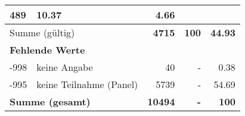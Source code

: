 \begin{longtable}{lXrrr}
       \num{489} &
       \num[round-mode=places,round-precision=2]{10,37} &
         \num[round-mode=places,round-precision=2]{4,66} \\
     \midrule
     \multicolumn{2}{l}{Summe (gültig)} &
       \textbf{\num{4715}} &
     \textbf{100} &
       \textbf{\num[round-mode=places,round-precision=2]{44,93}} \\
     \multicolumn{5}{l}{\textbf{Fehlende Werte}}\\
       -998 &
       keine Angabe &
         \num{40} &
        - &
         \num[round-mode=places,round-precision=2]{0,38} \\
       -995 &
       keine Teilnahme (Panel) &
         \num{5739} &
        - &
         \num[round-mode=places,round-precision=2]{54,69} \\
     \midrule
     \multicolumn{2}{l}{\textbf{Summe (gesamt)}} &
          \textbf{\num{10494}} &
        \textbf{-} &
        \textbf{100} \\
     \bottomrule
     \end{longtable}
     

